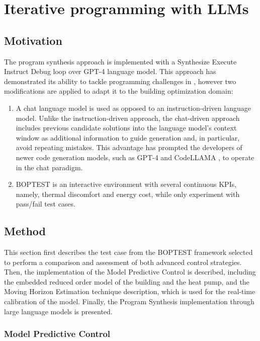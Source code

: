 \chapter{Iterative programming with LLMs}
\label{ch:boptest}

\section{Motivation}

The program synthesis approach is implemented with a Synthesize Execute Instruct Debug loop over GPT-4 \cite{GPT2023} language model. This approach has demonstrated its ability to tackle programming challenges in \cite{Reflexion2023,teaching2023,Fully2023}, however two modifications are applied to adapt it to the building optimization domain:

\begin{enumerate}
  \item A chat language model is used as opposed to an instruction-driven language model. Unlike the instruction-driven approach, the chat-driven approach includes previous candidate solutions into the language model’s context window as additional information to guide generation and, in particular, avoid repeating mistakes. This advantage has prompted the developers of newer code generation models, such as GPT-4 and CodeLLAMA \cite{Code2023}, to operate in the chat paradigm.
  \item BOPTEST is an interactive environment with several continuous KPIs, namely, thermal discomfort and energy cost, while \cite{Reflexion2023,teaching2023,Fully2023} only experiment with pass/fail test cases.
\end{enumerate}

\todo{}

\newpage
\section{Method}
This section first describes the test case from the BOPTEST framework selected to perform a comparison and assessment of both advanced control strategies. Then, the implementation of the Model Predictive Control is described, including the embedded reduced order model of the building and the heat pump, and the Moving Horizon Estimation technique description, which is used for the real-time calibration of the model. Finally, the Program Synthesis implementation through large language models is presented.

\subsection{Model Predictive Control}

